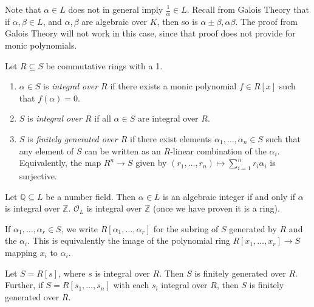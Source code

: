 Note that \( \alpha \in L \) does not in general imply \( \frac{1}{\alpha} \in L \).
Recall from Galois Theory that if \( \alpha, \beta \in L \), and \( \alpha, \beta \) are algebraic over \( K \), then so is \( \alpha \pm \beta, \alpha \beta \).
The proof from Galois Theory will not work in this case, since that proof does not provide for monic polynomials.
\begin{definition}
    Let \( R \subseteq S \) be commutative rings with a 1.
    \begin{enumerate}
        \item \( \alpha \in S \) is \emph{integral over \( R \)} if there exists a monic polynomial \( f \in R[x] \) such that \( f(\alpha) = 0 \).
        \item \( S \) is \emph{integral over \( R \)} if all \( \alpha \in S \) are integral over \( R \).
        \item \( S \) is \emph{finitely generated over \( R \)} if there exist elements \( \alpha_1, \dots, \alpha_n \in S \) such that any element of \( S \) can be written as an \( R \)-linear combination of the \( \alpha_i \).
        Equivalently, the map \( R^n \to S \) given by \( (r_1, \dots, r_n) \mapsto \sum_{i=1}^n r_i \alpha_i \) is surjective.
    \end{enumerate}
\end{definition}
\begin{example}
    Let \( \mathbb Q \subseteq L \) be a number field.
    Then \( \alpha \in L \) is an algebraic integer if and only if \( \alpha \) is integral over \( \mathbb Z \).
    \( \mathcal O_L \) is integral over \( \mathbb Z \) (once we have proven it is a ring).
\end{example}
If \( \alpha_1, \dots, \alpha_r \in S \), we write \( R[\alpha_1, \dots, \alpha_r] \) for the subring of \( S \) generated by \( R \) and the \( \alpha_i \).
This is equivalently the image of the polynomial ring \( R[x_1, \dots, x_r] \to S \) mapping \( x_i \) to \( \alpha_i \).
\begin{proposition}
    Let \( S = R[s] \), where \( s \) is integral over \( R \).
    Then \( S \) is finitely generated over \( R \).
    Further, if \( S = R[s_1, \dots, s_n] \) with each \( s_i \) integral over \( R \), then \( S \) is finitely generated over \( R \).
\end{proposition}
